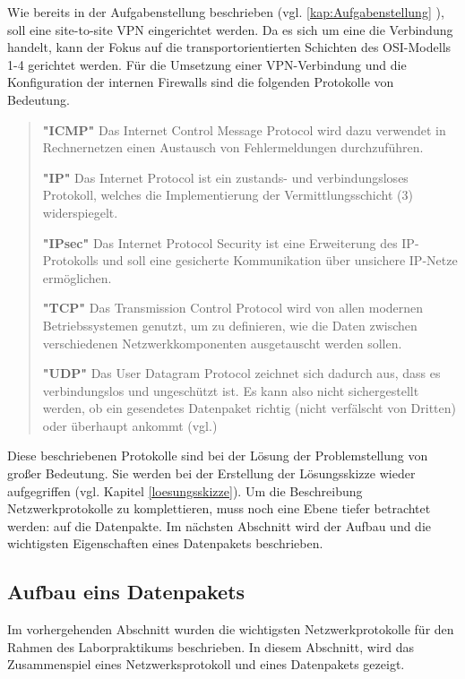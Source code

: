 \documentclass[
a4paper,     %
 headsepline, %
footsepline, %
titlepage,   %
 halfparskip,     %
 fleqn,       %
12pt         %
]{scrartcl}  %
\begin{document}
Wie bereits in der Aufgabenstellung beschrieben (vgl. \ref{kap:Aufgabenstellung} ), soll eine site-to-site VPN eingerichtet werden. Da es sich um eine die Verbindung handelt, kann der Fokus auf die transportorientierten Schichten des OSI-Modells 1-4 gerichtet werden. Für die Umsetzung einer VPN-Verbindung und die Konfiguration der internen Firewalls sind die folgenden Protokolle von Bedeutung. 
\begin{quotation}
\item [\textbf{"ICMP"}] Das Internet Control Message Protocol wird dazu verwendet in Rechnernetzen einen Austausch von Fehlermeldungen durchzuführen. 
\item [\textbf{"IP"}] Das Internet Protocol ist ein zustands- und verbindungsloses Protokoll, welches die Implementierung der Vermittlungsschicht (3) widerspiegelt. 
\item [\textbf{"IPsec"}] Das Internet Protocol Security ist eine Erweiterung des IP-Protokolls und soll eine gesicherte Kommunikation über unsichere IP-Netze ermöglichen.  
\item [\textbf{"TCP"}] Das Transmission Control Protocol wird von allen modernen Betriebssystemen genutzt, um zu definieren, wie die Daten zwischen verschiedenen Netzwerkkomponenten ausgetauscht werden sollen. 
\item [\textbf{"UDP"}] Das User Datagram Protocol zeichnet sich dadurch aus, dass es verbindungslos und ungeschützt ist. Es kann also nicht sichergestellt werden, ob ein gesendetes Datenpaket richtig (nicht verfälscht von Dritten) oder überhaupt ankommt (vgl.\cite{Kurose2008Computernetzwerke})
\end{quotation}
Diese beschriebenen Protokolle sind bei der Lösung der Problemstellung von großer Bedeutung. Sie werden bei der Erstellung der Lösungsskizze wieder aufgegriffen (vgl. Kapitel \ref{loesungsskizze}). Um die Beschreibung Netzwerkprotokolle zu komplettieren, muss noch eine Ebene tiefer betrachtet werden: auf die Datenpakte. Im nächsten Abschnitt wird der Aufbau und die wichtigsten Eigenschaften eines Datenpakets beschrieben. 

\subsection{Aufbau eins Datenpakets}
Im vorhergehenden Abschnitt wurden die wichtigsten Netzwerkprotokolle für den Rahmen des Laborpraktikums beschrieben. In diesem Abschnitt, wird das Zusammenspiel eines Netzwerksprotokoll und eines Datenpakets gezeigt. 
 
\end{document}
